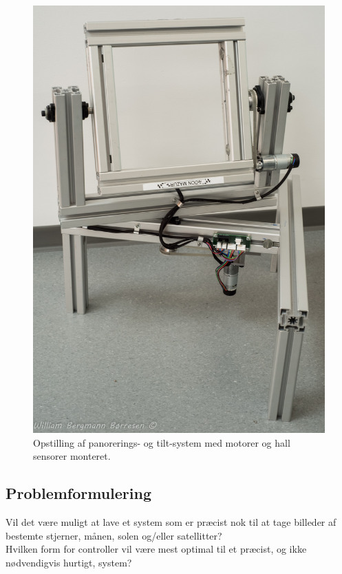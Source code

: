 \begin{figure}[H]
	\begin{center}
		\includegraphics[scale=0.15]{Billeder/opstilling.jpg}
		\caption{Opstilling af panorerings- og tilt-system med motorer og hall sensorer monteret.}
		\label{fig:Opstilling}
	\end{center}
\end{figure}

\subsection{Problemformulering}

Vil det være muligt at lave et system som er præcist nok til at tage billeder af bestemte stjerner, månen, solen og/eller satellitter?\\
Hvilken form for controller vil være mest optimal til et præcist, og ikke nødvendigvis hurtigt, system?

